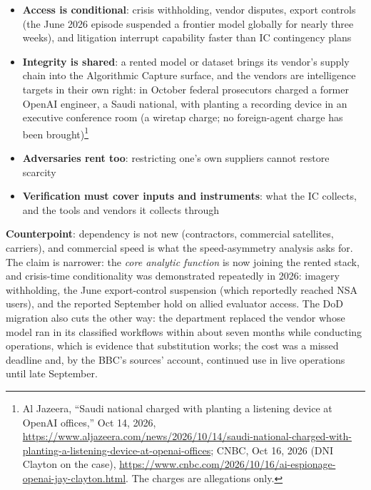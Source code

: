 \documentclass[11pt,letterpaper]{article}
\begin{document}
\begin{keybox}
\begin{itemize}[nosep]
  \item \textbf{Access is conditional}: crisis withholding, vendor disputes, export controls (the June 2026 episode suspended a frontier model globally for nearly three weeks), and litigation interrupt capability faster than IC contingency plans
  \item \textbf{Integrity is shared}: a rented model or dataset brings its vendor's supply chain into the Algorithmic Capture surface, and the vendors are intelligence targets in their own right: in October federal prosecutors charged a former OpenAI engineer, a Saudi national, with planting a recording device in an executive conference room (a wiretap charge; no foreign-agent charge has been brought)\footnote{Al Jazeera, ``Saudi national charged with planting a listening device at OpenAI offices,'' Oct 14, 2026, \url{https://www.aljazeera.com/news/2026/10/14/saudi-national-charged-with-planting-a-listening-device-at-openai-offices}; CNBC, Oct 16, 2026 (DNI Clayton on the case), \url{https://www.cnbc.com/2026/10/16/ai-espionage-openai-jay-clayton.html}. The charges are allegations only.}
  \item \textbf{Adversaries rent too}: restricting one's own suppliers cannot restore scarcity
  \item \textbf{Verification must cover inputs and instruments}: what the IC collects, and the tools and vendors it collects through
\end{itemize}
\textbf{Counterpoint}: dependency is not new (contractors, commercial satellites, carriers), and commercial speed is what the speed-asymmetry analysis asks for. The claim is narrower: the \textit{core analytic function} is now joining the rented stack, and crisis-time conditionality was demonstrated repeatedly in 2026: imagery withholding, the June export-control suspension (which reportedly reached NSA users), and the reported September hold on allied evaluator access. The DoD migration also cuts the other way: the department replaced the vendor whose model ran in its classified workflows within about seven months while conducting operations, which is evidence that substitution works; the cost was a missed deadline and, by the BBC's sources' account, continued use in live operations until late September.
\end{keybox}
\end{document}
